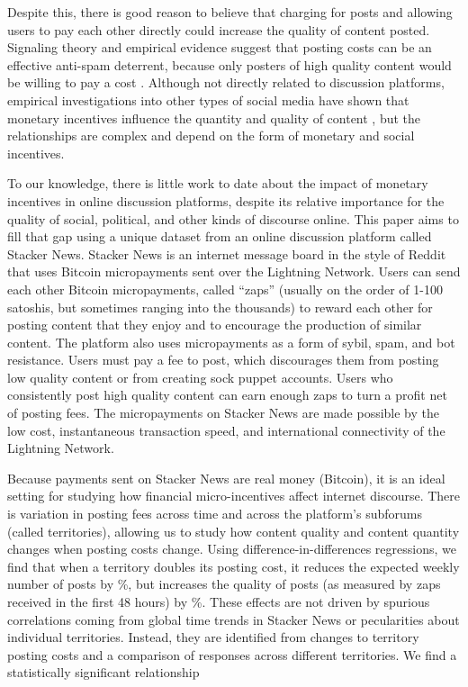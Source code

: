 Despite this, there is good reason to believe that charging for posts and allowing users to pay each other directly could increase the quality of content posted. Signaling theory and empirical evidence suggest that posting costs can be an effective anti-spam deterrent, because only posters of high quality content would be willing to pay a cost \citep{joseph2008email, tchernichovski2019pnas}. Although not directly related to discussion platforms, empirical investigations into other types of social media have shown that monetary incentives influence the quantity and quality of content \citep{chen2010google, sun2013blogs, burtch2017ms, elkomboz2023youtube, kerkhof2024youtube}, but the relationships are complex and depend on the form of monetary and social incentives.

To our knowledge, there is little work to date about the impact of monetary incentives in online discussion platforms, despite its relative importance for the quality of social, political, and other kinds of discourse online. This paper aims to fill that gap using a unique dataset from an online discussion platform called Stacker News. Stacker News is an internet message board in the style of Reddit that uses Bitcoin micropayments sent over the Lightning Network. Users can send each other Bitcoin micropayments, called ``zaps'' (usually on the order of 1-100 satoshis, but sometimes ranging into the thousands) to reward each other for posting content that they enjoy and to encourage the production of similar content. The platform also uses micropayments as a form of sybil, spam, and bot resistance. Users must pay a fee to post, which discourages them from posting low quality content or from creating sock puppet accounts. Users who consistently post high quality content can earn enough zaps to turn a profit net of posting fees. The micropayments on Stacker News are made possible by the low cost, instantaneous transaction speed, and international connectivity of the Lightning Network. 

Because payments sent on Stacker News are real money (Bitcoin), it is an ideal setting for studying how financial micro-incentives affect internet discourse. There is variation in posting fees across time and across the platform's subforums (called territories), allowing us to study how content quality and content quantity changes when posting costs change. Using difference-in-differences regressions, we find that when a territory doubles its posting cost, it reduces the expected weekly number of posts by \%, but increases the quality of posts (as measured by zaps received in the first 48 hours) by \%. These effects are not driven by spurious correlations coming from global time trends in Stacker News or pecularities about individual territories. Instead, they are identified from changes to territory posting costs and a comparison of responses across different territories. We find a statistically significant relationship 